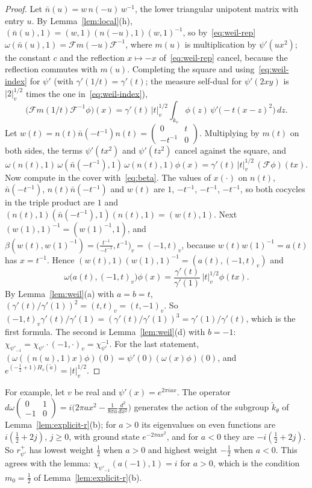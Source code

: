 \begin{proof}
Let $\bar n(u)=w\,n(-u)\,w^{-1}$, the lower triangular unipotent matrix
with entry $u$. By Lemma~\ref{lem:local}(h),
$(\bar n(u),1)=(w,1)(n(-u),1)(w,1)^{-1}$, so by~\eqref{eq:weil-rep}
$\omega(\bar n(u),1)=\mathcal F m(-u)\mathcal F^{-1}$, where $m(u)$ is
multiplication by $\psi'(ux^2)$; the constant $c$ and the reflection
$x\mapsto-x$ of~\eqref{eq:weil-rep} cancel, because the reflection
commutes with $m(u)$. Completing the square and using~\eqref{eq:weil-index} for
$\psi'$ (with $\gamma'(1/t)=\gamma'(t)$; the measure self-dual for
$\psi'(2xy)$ is $|2|_v^{1/2}$ times the one in~\eqref{eq:weil-index}),
\[
\bigl(\mathcal Fm(1/t)\mathcal F^{-1}\phi\bigr)(x)=\gamma'(t)\,|t|_v^{1/2}
\int_{k_v}\phi(z)\,\psi'\bigl(-t(x-z)^2\bigr)\,dz .
\]
Let $w(t)=n(t)\bar n(-t^{-1})n(t)=\begin{pmatrix}0&t\\-t^{-1}&0
\end{pmatrix}$. Multiplying by $m(t)$ on both sides, the terms
$\psi'(tx^2)$ and $\psi'(tz^2)$ cancel against the square, and
\[
\omega(n(t),1)\,\omega(\bar n(-t^{-1}),1)\,\omega(n(t),1)\phi(x)
=\gamma'(t)\,|t|_v^{1/2}\,(\mathcal F\phi)(tx).
\]
Now compute in the cover with~\eqref{eq:beta}. The values of $x(\cdot)$
on $n(t)$, $\bar n(-t^{-1})$, $n(t)\bar n(-t^{-1})$ and $w(t)$ are $1$,
$-t^{-1}$, $-t^{-1}$, $-t^{-1}$, so both cocycles in the triple product are
$1$ and $(n(t),1)(\bar n(-t^{-1}),1)(n(t),1)=(w(t),1)$. Next
$(w(1),1)^{-1}=(w(1)^{-1},1)$, and $\beta(w(t),w(1)^{-1})=
\bigl(\frac{t^{-1}}{-t^{-1}},t^{-1}\bigr)_v=(-1,t)_v$, because
$w(t)w(1)^{-1}=a(t)$ has $x=t^{-1}$. Hence $(w(t),1)(w(1),1)^{-1}=
(a(t),(-1,t)_v)$ and
\[
\omega\bigl(a(t),(-1,t)_v\bigr)\phi(x)=\frac{\gamma'(t)}{\gamma'(1)}\,
|t|_v^{1/2}\phi(tx).
\]
By Lemma~\ref{lem:weil}(a) with $a=b=t$, $(\gamma'(t)/\gamma'(1))^2=
(t,t)_v=(t,-1)_v$. So $(-1,t)_v\gamma'(t)/\gamma'(1)=(\gamma'(t)/
\gamma'(1))^3=\gamma'(1)/\gamma'(t)$, which is the first formula. The
second is Lemma~\ref{lem:weil}(d) with $b=-1$:
$\chi_{\psi'_{-1}}=\chi_{\psi'}\cdot(-1,\cdot)_v=\chi_{\psi'}^{-1}$. For the
last statement, $(\omega((n(u),1)x)\phi)(0)=\psi'(0)(\omega(x)\phi)(0)$,
and $e^{(-\frac12+1)H_v(\tilde a)}=|t|_v^{1/2}$.
\end{proof}

For example, let $v$ be real and $\psi'(x)=e^{2\pi iax}$. The operator
$d\omega\begin{pmatrix}0&1\\-1&0\end{pmatrix}=i\bigl(2\pi ax^2-
\frac1{8\pi a}\frac{d^2}{dx^2}\bigr)$ generates the action of the
subgroup $\tilde k_\theta$ of Lemma~\ref{lem:explicit-r}(b); for $a>0$ its
eigenvalues on even functions are $i(\frac12+2j)$, $j\ge0$, with ground
state $e^{-2\pi ax^2}$, and for $a<0$ they are $-i(\frac12+2j)$. So
$r^+_{\psi'}$ has lowest weight $\frac12$ when $a>0$ and highest weight
$-\frac12$ when $a<0$. This agrees with the lemma:
$\chi_{\psi'_{-1}}(a(-1),1)=i$ for $a>0$, which is the condition
$m_0=\frac12$ of Lemma~\ref{lem:explicit-r}(b).

